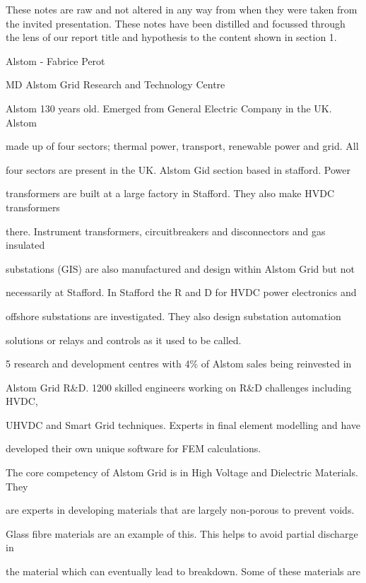 {}
 \label{Notes}
These notes are raw and not altered in any way from when they were taken from the invited presentation. These notes have been distilled and focussed through the lens of our report title and hypothesis to the content shown in section 1.

Alstom - Fabrice Perot

MD Alstom Grid Research and Technology Centre

Alstom 130 years old. Emerged from General Electric Company in the UK. Alstom 

made up of four sectors; thermal power, transport, renewable power and grid. All 

four sectors are present in the UK. Alstom Gid section based in stafford. Power 

transformers are built at a large factory in Stafford. They also make HVDC transformers 

there. Instrument transformers, circuitbreakers and disconnectors and gas insulated 

substations (GIS) are also manufactured and design within Alstom Grid but not 

necessarily at Stafford. In Stafford the R and D for HVDC power electronics and 

offshore substations are investigated. They also design substation automation 

solutions or relays and controls as it used to be called.

5 research and development centres with 4\% of Alstom sales being reinvested in 

Alstom Grid R\&D. 1200 skilled engineers working on R\&D challenges including HVDC, 

UHVDC and Smart Grid techniques. Experts in final element modelling and have 

developed their own unique software for FEM calculations.

The core competency of Alstom Grid is in High Voltage and Dielectric Materials. They 

are experts in developing materials that are largely non-porous to prevent voids. 

Glass fibre materials are an example of this. This helps to avoid partial discharge in 

the material which can eventually lead to breakdown. Some of these materials are 

